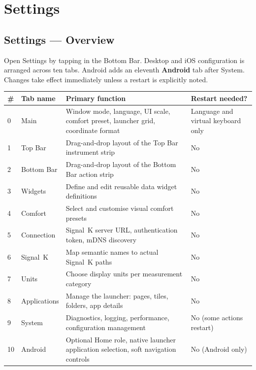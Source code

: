 \part{Settings}

\chapter{Settings --- Overview}
\label{ch:settings}

Open Settings by tapping  in the Bottom Bar.
Desktop and iOS configuration is arranged across ten tabs. Android adds an
eleventh \textbf{Android} tab after System.
Changes take effect immediately unless a restart is explicitly noted.


\begin{longtable}{C{0.6cm}L{3.0cm}L{6.8cm}L{3.3cm}}
\toprule
{}
\color{white}\sffamily\bfseries \# &
\color{white}\sffamily\bfseries Tab name &
\color{white}\sffamily\bfseries Primary function &
\color{white}\sffamily\bfseries Restart needed? \\
 & Main           & Window mode, language, UI scale, comfort preset, launcher grid, coordinate format & Language and virtual keyboard only \\
1 & Top Bar        & Drag-and-drop layout of the Top Bar instrument strip & No \\
2 & Bottom Bar     & Drag-and-drop layout of the Bottom Bar action strip & No \\
3 & Widgets        & Define and edit reusable data widget definitions & No \\
4 & Comfort        & Select and customise visual comfort presets & No \\
5 & Connection     & Signal~K server URL, authentication token, mDNS discovery & No \\
6 & Signal~K       & Map semantic names to actual Signal~K paths & No \\
7 & Units          & Choose display units per measurement category & No \\
8 & Applications   & Manage the launcher: pages, tiles, folders, app details & No \\
9 & System         & Diagnostics, logging, performance, configuration management & No (some actions restart) \\
10 & Android       & Optional Home role, native launcher application selection, soft navigation controls & No (Android only) \\
\bottomrule
\end{longtable}

